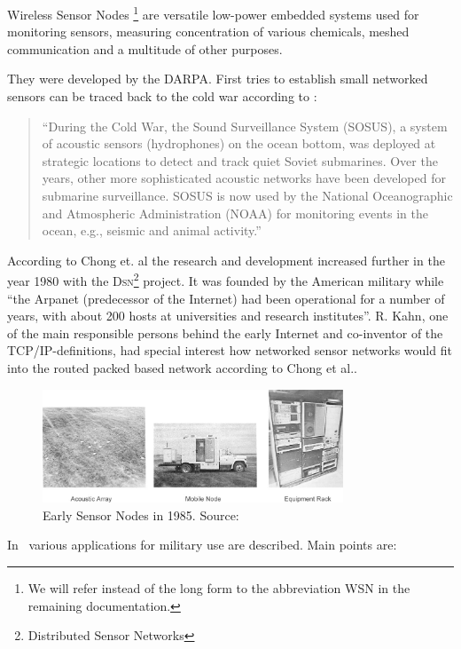 Wireless Sensor Nodes \footnote{We will refer instead of the long form to the abbreviation \textsc{WSN} in the remaining documentation.}
are versatile low-power embedded systems used for monitoring sensors, measuring concentration of various chemicals, meshed communication
and a multitude of other purposes.

They were developed by the DARPA\cite{Song}. First tries to establish small networked sensors can be traced back to the cold war according to
\cite{Chong}:

\begin{quote}
    ``During the Cold War, the Sound Surveillance System
    (SOSUS), a system of acoustic sensors (hydrophones) on the
    ocean bottom, was deployed at strategic locations to detect
    and track quiet Soviet submarines. Over the years, other
    more sophisticated acoustic networks have been developed
    for submarine surveillance. SOSUS is now used by the
    National Oceanographic and Atmospheric Administration
    (NOAA) for monitoring events in the ocean, e.g., seismic
    and animal activity.''
\end{quote}

According to Chong et. al the research and development increased further in the year 1980 with the \textsc{Dsn}\footnote{Distributed Sensor Networks} project.
It was founded by the American military while 
``the Arpanet (predecessor of the Internet) had been operational for a number of years, with 
about 200 hosts at universities and research institutes''\cite{Chong}.
R. Kahn, one of the main responsible persons behind the early Internet and co-inventor of the TCP/IP-definitions, had special interest how networked
sensor networks would fit into the routed packed based network according to Chong et al..

\begin{figure}[H]
   \centering
   \includegraphics[width=0.8\textwidth]{pic/earlynode.png}%
   \caption{Early Sensor Nodes in 1985. Source: \cite{Chong}}
   \label{earlynode}%
\end{figure}

In~\cite{Akyildiz02wirelesssensor} various applications for military use are described. Main points are:

